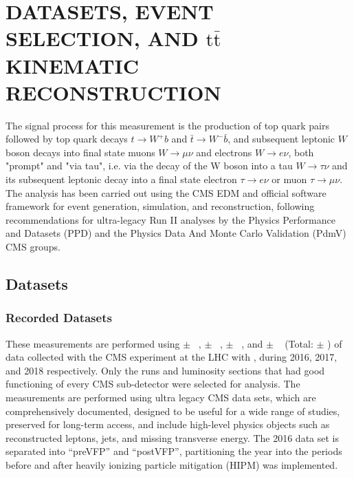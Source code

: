 
\chapter{DATASETS, EVENT SELECTION, AND \ensuremath{\mathrm{t\bar{t}}} KINEMATIC RECONSTRUCTION}
\label{Datasets_Event_Selection_Kinematic_Reconstruction}
The signal process for this measurement is the production of top quark pairs followed by top quark decays $t\to W^+ b$ and $\bar{t}\to W^- \bar{b}$, and subsequent leptonic $W$ boson decays into final state muons $W\to \mu\nu$ and electrons $W\to e\nu$, both "prompt" and "via tau", i.e. via the decay of the W boson into a tau $W\to \tau\nu$ and its subsequent leptonic decay into a final state electron $\tau\to e\nu$ or muon $\tau\to \mu\nu$.
The analysis has been carried out using the CMS EDM and official software framework for event generation, simulation, and reconstruction, following recommendations for ultra-legacy Run II analyses by the Physics Performance and Datasets (PPD) and the Physics Data And Monte Carlo Validation (PdmV) CMS groups.

\section{Datasets}

\subsection{Recorded Datasets}
These measurements are performed using \lumivalueSixPreVFP $\pm$ \lumierrSixPreVFP~\cite{bib:lumipas16}, \lumivalueSixPostVFP $\pm$ \lumierrSixPostVFP~\cite{bib:lumipas16}, \lumivalueSeven $\pm$ \lumierrSeven~\cite{bib:lumipas17}, and \lumivalueEight $\pm$ \lumierrEight~\cite{bib:lumipas18} (Total: \lumivalueRuniiUL $\pm$ \lumierrRuniiUL) of data collected with the CMS experiment at the LHC with \beamenergy, during 2016, 2017, and 2018 respectively.
Only the runs and luminosity sections that had good functioning of every CMS sub-detector were selected for analysis.
The measurements are performed using ultra legacy CMS data sets, which are comprehensively documented, designed to be useful for a wide range of studies, preserved for long-term access, and include high-level physics objects such as reconstructed leptons, jets, and missing transverse energy.
The 2016 data set is separated into ``preVFP'' and ``postVFP'', partitioning the year into the periods before and after heavily ionizing particle mitigation (HIPM) was implemented.

